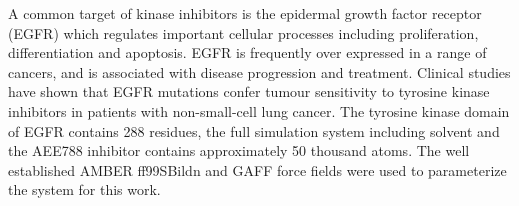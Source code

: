 A common target of kinase inhibitors is the epidermal growth factor receptor (EGFR) which regulates important cellular processes including proliferation, differentiation and apoptosis.
EGFR is frequently over expressed in a range of cancers, and is associated with disease progression and treatment. 
Clinical studies have shown that EGFR mutations confer tumour sensitivity to tyrosine kinase inhibitors in patients with non-small-cell lung cancer.
The tyrosine kinase domain of EGFR contains 288 residues, the full simulation system including solvent and the AEE788 inhibitor contains approximately 50 thousand atoms.
The well established AMBER ff99SBildn and GAFF force fields \cite{Maier2015, Wang2004} were used to parameterize the system for this work.
